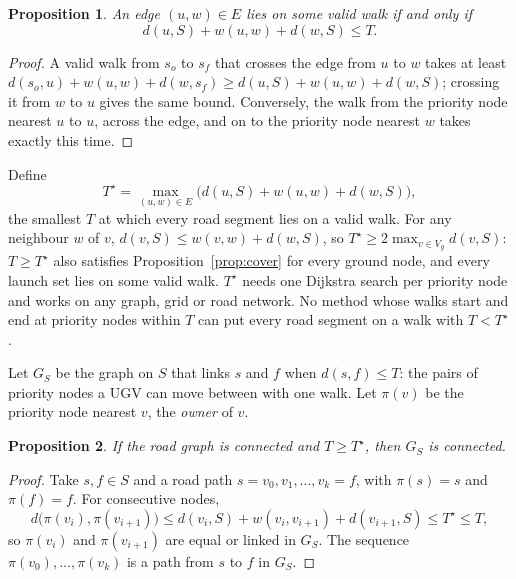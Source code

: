 \documentclass[11pt]{article}
\theoremstyle{definition}
\theoremstyle{plain}
\newtheorem{proposition}{Proposition}
\begin{document}
\begin{proposition}
\label{prop:edge}
An edge $(u, w) \in E$ lies on some valid walk if and only if
\begin{equation}
d(u, S) + w(u, w) + d(w, S) \leq T .
\end{equation}
\end{proposition}
\begin{proof}
A valid walk from $s_o$ to $s_f$ that crosses the edge from $u$ to $w$
takes at least $d(s_o, u) + w(u, w) + d(w, s_f) \geq d(u, S) + w(u, w) +
d(w, S)$; crossing it from $w$ to $u$ gives the same bound. Conversely,
the walk from the priority node nearest $u$ to $u$, across the edge, and
on to the priority node nearest $w$ takes exactly this time.
\end{proof}

Define
\begin{equation}
T^\star = \max_{(u, w) \in E} \big( d(u, S) + w(u, w) + d(w, S) \big),
\end{equation}
the smallest $T$ at which every road segment lies on a valid walk. For any
neighbour $w$ of $v$, $d(v, S) \leq w(v, w) + d(w, S)$, so $T^\star \geq
2 \max_{v \in V_g} d(v, S)$: $T \geq T^\star$ also satisfies
Proposition~\ref{prop:cover} for every ground node, and every launch set
lies on some valid walk. $T^\star$ needs one Dijkstra search per priority
node and works on any graph, grid or road network. No method whose walks
start and end at priority nodes within $T$ can put every road segment on
a walk with $T < T^\star$.

Let $G_S$ be the graph on $S$ that links $s$ and $f$ when $d(s, f) \leq
T$: the pairs of priority nodes a UGV can move between with one walk. Let
$\pi(v)$ be the priority node nearest $v$, the \emph{owner} of $v$.

\begin{proposition}
\label{prop:conn}
If the road graph is connected and $T \geq T^\star$, then $G_S$ is
connected.
\end{proposition}
\begin{proof}
Take $s, f \in S$ and a road path $s = v_0, v_1, \ldots, v_k = f$, with
$\pi(s) = s$ and $\pi(f) = f$. For consecutive nodes,
\begin{equation*}
d\big(\pi(v_i), \pi(v_{i+1})\big) \leq d(v_i, S) + w(v_i, v_{i+1}) +
d(v_{i+1}, S) \leq T^\star \leq T ,
\end{equation*}
so $\pi(v_i)$ and $\pi(v_{i+1})$ are equal or linked in $G_S$. The
sequence $\pi(v_0), \ldots, \pi(v_k)$ is a path from $s$ to $f$ in $G_S$.
\end{proof}
\end{document}

